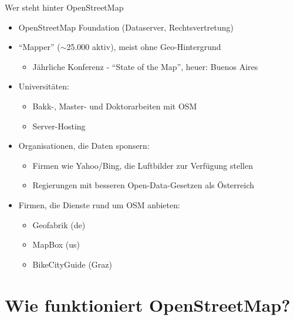 \documentclass{beamer}
\begin{document}
\begin{frame}{Wer steht hinter OpenStreetMap}

  \begin{itemize}
    \item OpenStreetMap Foundation (Dataserver, Rechtsvertretung)
      \pause
    \item "`Mapper"' ($\sim$25.000 aktiv), meist ohne Geo-Hintergrund
    \begin{itemize}
      \item Jährliche Konferenz - "`State of the Map"', heuer: Buenos Aires
    \end{itemize}
      \pause
    \item Universitäten:
    \begin{itemize}
      \item Bakk-, Master- und Doktorarbeiten mit OSM
      \item Server-Hosting
    \end{itemize}
      \pause
    \item Organisationen, die Daten sponsern:
    \begin{itemize}
      \item Firmen wie Yahoo/Bing, die Luftbilder zur Verfügung stellen
      \item Regierungen mit besseren Open-Data-Gesetzen als Österreich 
    \end{itemize}
      \pause
    \item Firmen, die Dienste rund um OSM anbieten:
    \begin{itemize}
      \item Geofabrik (de)
      \item MapBox (us)
      \item BikeCityGuide (Graz)
    \end{itemize}
  \end{itemize}

\end{frame}

  


\section{Wie funktioniert OpenStreetMap?}
\end{document}
